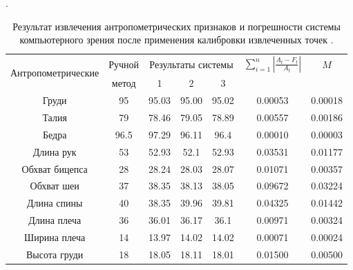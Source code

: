 \begin{table}[b!]%
\begin{center}
\caption{Результат извлечения антропометрических признаков и погрешности системы компьютерного зрения после применения калибровки извлеченных точек \cite{long1,long2}.}.\label{tab3}
  \begin{tabular}{|c|c|c|c|c|c|c|}
    \hline
    \multirow{2}{*}{Антропометрические} & {Ручной} & \multicolumn{3}{c}{Результаты системы} & {$\sum^n_{i=1}\left|\frac{A_t-F_t}{A_t}\right|$} &{$M$} \\
      признаки& метод  &1 &2 &3 & & \\
    \hline
Груди &95	&95.03	&95.00	&95.02	&0.00053	&0.00018 \\
\hline 
Талия             &79	&78.46	&79.05	&78.89	&0.00557	&0.00186\\

\hline
Бедра               &96.5	&97.29	&96.11	&96.4	&0.00010	&0.00003\\

\hline
Длина рук           &53	&52.93		&52.1	&52.93	&0.03531	&0.01177\\

\hline
Обхват бицепса      &28	&28.24	&28.03	&28.07	&0.01071	&0.00357\\

\hline
Обхват шеи         &37	&38.35	&38.13	&38.05	&0.09672	&0.03224\\

\hline
Длина спины         &40	&38.35	&39.96	&39.81	&0.04325	&0.01442\\

\hline
Длина плеча       &36	&36.01	&36.17	&36.1	&0.00971	&0.00324\\

\hline
Ширина плеча        &14	&13.97	&14.02	&14.02	&0.00071	&0.00024\\

\hline
Высота груди       &18	&18.05	&18.11	&18.01	&0.01500	&0.00500\\

\hline
  \end{tabular}
\end{center}
\end{table}%

